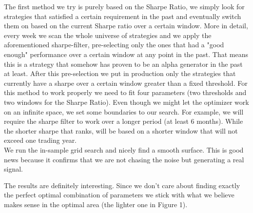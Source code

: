 The first method we try is purely based on the Sharpe Ratio, we simply look for strategies that satisfied a certain requirement in the past and eventually switch them on based on the current Sharpe ratio over a certain window. More in detail, every week we scan the whole universe of strategies and we apply the aforementioned sharpe-filter, pre-selecting only the ones that had a "good enough" performance over a certain window at any point in the past. That means this is a strategy that somehow has proven to be an alpha generator in the past at least. After this pre-selection we put in production only the strategies that currently have a sharpe over a certain window greater than a fixed threshold. For this method to work properly we need to fit four parameters (two thresholds and two windows for the Sharpe Ratio). Even though we might let the optimizer work on an infinite space, we set some boundaries to our search. For example, we will require the sharpe filter to work over a longer period (at least 6 months). While the shorter sharpe that ranks, will be based on a shorter window that will not exceed one trading year.\\
We run the in-sample grid search and nicely find a smooth surface. This is good news because it confirms that we are not chasing the noise but generating a real signal. 



The results are definitely interesting. Since we don't care about finding exactly the perfect optimal combination of parameters we stick with what we believe makes sense in the optimal area (the lighter one in Figure 1).